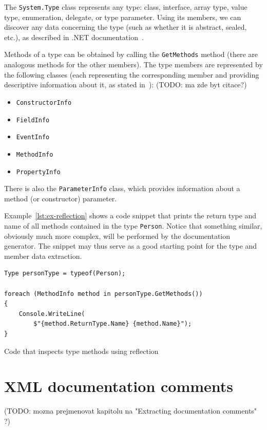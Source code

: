 The \texttt{System.Type} class represents any type: class, interface, array type, value type, enumeration, delegate, or type parameter.
Using its members, we can discover any data concerning the type (such as whether it is abstract, sealed, etc.), as described in .NET documentation~\cite{dotnet_reflection}.

Methods of a type can be obtained by calling the \texttt{GetMethods} method (there are analogous methods for the other members).
The type members are represented by the following classes (each representing
the corresponding member and providing descriptive information about it, as stated in~\cite{dotnet_reflection}): (TODO: ma zde byt citace?)

\begin{itemize}
    \item \texttt{ConstructorInfo}
    \item \texttt{FieldInfo}
    \item \texttt{EventInfo}
    \item \texttt{MethodInfo}
    \item \texttt{PropertyInfo}
\end{itemize}

There is also the \texttt{ParameterInfo} class, which provides information about a method (or constructor) parameter. 

Example~\ref{lst:ex-reflection} shows a code snippet that prints the return type and name of all methods contained in the type \texttt{Person}.
Notice that something similar, obviously much more complex, will be performed by the documentation generator.
The snippet may thus serve as a good starting point for the type and member data extraction.

\begin{listing}
\begin{lstlisting}
Type personType = typeof(Person);

foreach (MethodInfo method in personType.GetMethods())
{
    Console.WriteLine(
        $"{method.ReturnType.Name} {method.Name}");
}
\end{lstlisting}
\caption{Code that inspects type methods using reflection}
\label{lst:ex-reflection}
\end{listing}

\section{XML documentation comments}

(TODO: mozna prejmenovat kapitolu na "Extracting documentation comments" ?)

